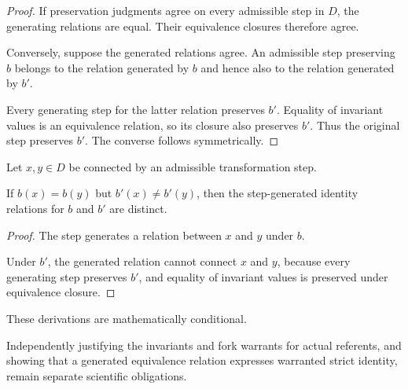 \begin{proof}
  If preservation judgments agree on every admissible step
  in $D$, the generating relations are equal.
  Their equivalence closures therefore agree.

  Conversely, suppose the generated relations agree.
  An admissible step preserving $b$ belongs to the relation
  generated by $b$ and hence also to the relation generated
  by $b'$.

  Every generating step for the latter relation preserves
  $b'$. Equality of invariant values is an equivalence
  relation, so its closure also preserves $b'$.
  Thus the original step preserves $b'$.
  The converse follows symmetrically.
\end{proof}

\begin{proposition}
  \label{se200.prop.StepSeparation}
  Let $x,y\in D$ be connected by an admissible
  transformation step.

  If $b(x)=b(y)$ but $b'(x)\ne b'(y)$, then the
  step-generated identity relations for $b$ and
  $b'$ are distinct.
\end{proposition}

\begin{proof}
  The step generates a relation between $x$ and $y$
  under $b$.

  Under $b'$, the generated relation cannot connect
  $x$ and $y$, because every generating step preserves
  $b'$, and equality of invariant values is preserved
  under equivalence closure.
\end{proof}

These derivations are mathematically conditional.

Independently justifying the invariants and fork warrants for actual referents,
and showing that a generated equivalence relation expresses warranted
strict identity, remain separate scientific obligations.
